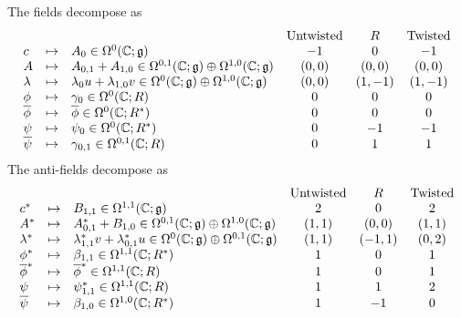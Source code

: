 \documentclass[10pt, oneside]{article}
\begin{document}
The fields decompose as
\[
\begin{array} {lllcccccc}
& &  & {\rm Untwisted} & R & {\rm Twisted}  \\
c & \mapsto & A_{0} \in \Omega^0(\mathbb C ; \mathfrak g) & -1 & 0 & -1 \\
A & \mapsto & A_{0,1} + A_{1,0} \in \Omega^{0,1}(\mathbb C ; \mathfrak g) \oplus \Omega^{1,0}(\mathbb C ; \mathfrak g)  & (0,0) & (0,0) & (0,0) \\
\lambda & \mapsto & \lambda_{0} u + \lambda_{1,0} v \in \Omega^{0}(\mathbb C ; \mathfrak g) \oplus \Omega^{1,0}(\mathbb C ; \mathfrak g) & (0,0) & (1,-1) & (1,-1) \\
\phi & \mapsto &  \gamma_0 \in \Omega^0 (\mathbb C ; R) & 0 & 0 & 0 \\
\overline{\phi} & \mapsto & \overline{\phi} \in \Omega^{0}(\mathbb C ; R^*) & 0 & 0 & 0 \\
\psi & \mapsto &  \psi_0 \in \Omega^{0}(\mathbb C ; R^*) & 0 & -1 & -1 \\
\overline{\psi} & \mapsto & \gamma_{0,1} \in \Omega^{0,1}(\mathbb C ; R)  & 0 & 1 & 1 
\end{array}
\]
The anti-fields decompose as
\[
\begin{array} {lllcccccc}
& &  & {\rm Untwisted} & R & {\rm Twisted}  \\
c^* & \mapsto & B_{1,1} \in \Omega^{1,1} (\mathbb C ; \mathfrak g) & 2 & 0 & 2 \\
A^* & \mapsto &  A^*_{0,1} + B_{1,0} \in \Omega^{0,1}(\mathbb C ; \mathfrak g) \oplus \Omega^{1,0}(\mathbb C ; \mathfrak g)  & (1,1) & (0,0) & (1,1) \\
\lambda^* & \mapsto &  \lambda^*_{1,1} v + \lambda^*_{0,1} u \in \Omega^{0}(\mathbb C ; \mathfrak g) \oplus \Omega^{0,1}(\mathbb C ; \mathfrak g)  & (1,1) & (-1,1) & (0,2) \\
\phi^* & \mapsto &   \beta_{1,1} \in \Omega^{1,1} (\mathbb C ; R^*) & 1 & 0 & 1 \\
\overline{\phi}^* & \mapsto &\overline{\phi}^* \in \Omega^{1,1}(\mathbb C ; R)  & 1 & 0 & 1 \\
\psi & \mapsto &   \psi^*_{1,1} \in \Omega^{1,1}(\mathbb C ; R) & 1 & 1 & 2 \\
\overline{\psi} & \mapsto &  \beta_{1,0} \in \Omega^{1,0}(\mathbb C ; R^*)   & 1 & -1 & 0 
\end{array}
\]

\end{document}
